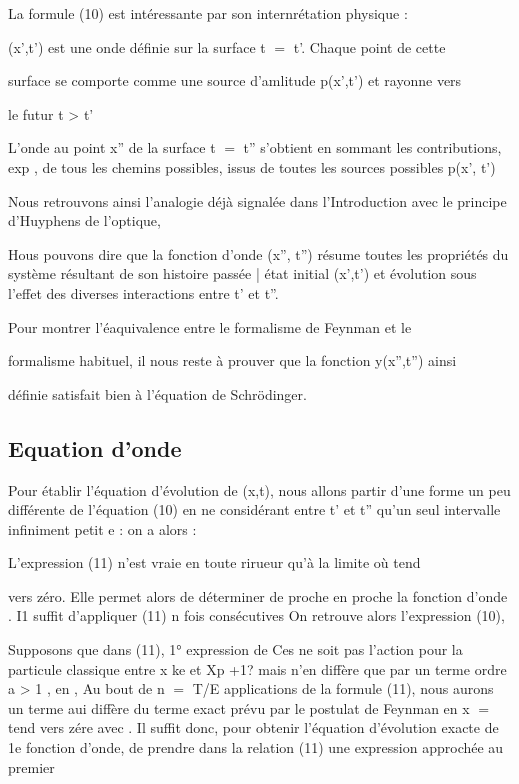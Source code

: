 La formule (10) est intéressante par son internrétation physique :

(x',t') est une onde définie sur la surface t $=$ t'. Chaque point de cette

surface se comporte comme une source d'amlitude p(x',t') et rayonne vers

le futur t > t'

L'onde au point x'' de la surface t $=$ t'' s'obtient en sommant les
contributions, exp  , de tous les chemins possibles, issus de toutes les
sources possibles p(x', t')

Nous retrouvons ainsi l'analogie déjà signalée dans l'Introduction
avec le principe d'Huyphens de l'optique,

Hous pouvons dire que la fonction d'onde (x'', t'') résume toutes les
propriétés du système résultant de son histoire passée | état initial (x',t')
et évolution sous l'effet des diverses interactions entre t' et t''.

Pour montrer l'éaquivalence entre le formalisme de Feynman et le

formalisme habituel, il nous reste à prouver que la fonction y(x'',t'') ainsi

définie satisfait bien à l'équation de Schrödinger.
%
\subsection{Equation d'onde}

Pour établir l'équation d'évolution de (x,t), nous allons
partir d'une forme un peu différente de l'équation (10) en ne considérant
entre t' et t'' qu'un seul intervalle infiniment petit e : on a alors :

L'expression (11) n'est vraie en toute rirueur qu'à la limite où  tend

 

vers zéro. Elle permet alors de déterminer de proche en proche la fonction
d'onde . I1 suffit d'appliquer (11) n fois consécutives
On retrouve alors l'expression (10),

Supposons que dans (11), 1° expression de  Ces   ne soit
pas l'action pour la particule classique entre x ke et Xp +1? mais n'en diffère
que par un terme ordre a > 1 , en , Au bout de n $=$ T/E applications
de la formule (11), nous aurons un terme aui diffère du terme exact prévu
par le postulat de Feynman en  x  $=$  tend vers zére avec . Il
suffit donc, pour obtenir l'équation d'évolution exacte de 1e fonction
d'onde, de prendre dans la relation (11) une expression approchée au premier

